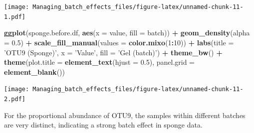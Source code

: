 \documentclass[]{book}
\newenvironment{Shaded}{\begin{snugshade}}{\end{snugshade}}
\newcommand{\KeywordTok}[1]{\textcolor[rgb]{0.13,0.29,0.53}{\textbf{#1}}}
\newcommand{\DataTypeTok}[1]{\textcolor[rgb]{0.13,0.29,0.53}{#1}}
\newcommand{\DecValTok}[1]{\textcolor[rgb]{0.00,0.00,0.81}{#1}}
\newcommand{\FloatTok}[1]{\textcolor[rgb]{0.00,0.00,0.81}{#1}}
\newcommand{\StringTok}[1]{\textcolor[rgb]{0.31,0.60,0.02}{#1}}
\newcommand{\CommentTok}[1]{\textcolor[rgb]{0.56,0.35,0.01}{\textit{#1}}}
\newcommand{\OperatorTok}[1]{\textcolor[rgb]{0.81,0.36,0.00}{\textbf{#1}}}
\newcommand{\NormalTok}[1]{#1}
\begin{document}
\begin{Shaded}
\end{Shaded}

\texttt{[image: Managing\_batch\_effects\_files/figure-latex/unnamed-chunk-11-1.pdf]}

\begin{Shaded}
\begin{Highlighting}[]
\KeywordTok{ggplot}\NormalTok{(sponge.before.df, }\KeywordTok{aes}\NormalTok{(}\DataTypeTok{x =}\NormalTok{ value, }\DataTypeTok{fill =}\NormalTok{ batch)) }\OperatorTok{+}\StringTok{ }
\StringTok{  }\KeywordTok{geom_density}\NormalTok{(}\DataTypeTok{alpha =} \FloatTok{0.5}\NormalTok{) }\OperatorTok{+}\StringTok{ }\KeywordTok{scale_fill_manual}\NormalTok{(}\DataTypeTok{values =} \KeywordTok{color.mixo}\NormalTok{(}\DecValTok{1}\OperatorTok{:}\DecValTok{10}\NormalTok{)) }\OperatorTok{+}\StringTok{ }
\StringTok{  }\KeywordTok{labs}\NormalTok{(}\DataTypeTok{title =} \StringTok{'OTU9 (Sponge)'}\NormalTok{, }\DataTypeTok{x =} \StringTok{'Value'}\NormalTok{, }\DataTypeTok{fill =} \StringTok{'Gel (batch)'}\NormalTok{) }\OperatorTok{+}\StringTok{ }
\StringTok{  }\KeywordTok{theme_bw}\NormalTok{() }\OperatorTok{+}\StringTok{ }\KeywordTok{theme}\NormalTok{(}\DataTypeTok{plot.title =} \KeywordTok{element_text}\NormalTok{(}\DataTypeTok{hjust =} \FloatTok{0.5}\NormalTok{), }
                     \DataTypeTok{panel.grid =} \KeywordTok{element_blank}\NormalTok{())}
\end{Highlighting}
\end{Shaded}

\texttt{[image: Managing\_batch\_effects\_files/figure-latex/unnamed-chunk-11-2.pdf]}

For the proportional abundance of OTU9, the samples within different
batches are very distinct, indicating a strong batch effect in sponge
data.
\end{document}

